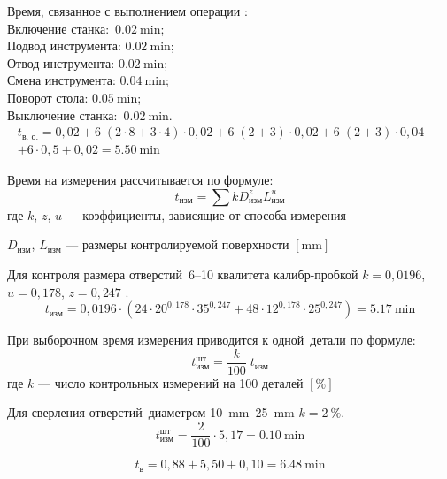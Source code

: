 \documentclass[14pt,russian,a4paper]{extreport}
\begin{document}
Время, связанное с выполнением операции \cite[прил.~4]{malzen:normirovanie}: \\
Включение станка: $\SI{0,02}{\minute}$; \\
Подвод инструмента: $\SI{0,02}{\minute}$; \\
Отвод инструмента: $\SI{0,02}{\minute}$; \\
Смена инструмента: $\SI{0,04}{\minute}$; \\
Поворот стола: $\SI{0,05}{\minute}$; \\
Выключение станка: $\SI{0,02}{\minute}$.
\begin{multline*}
  t_\text{в. о.} = 0,02 + 6 \; (2 \cdot 8 + 3 \cdot 4) \cdot 0,02  + 6 \; (2 + 3) \cdot 0,02 + 6 \; (2 + 3) \cdot 0,04 \; + \\ + 6 \cdot 0,5 + 0,02 = \SI{5,50}{\minute}
\end{multline*}

Время на измерения рассчитывается по формуле:
\begin{equation}
  t_\text{изм} = \sum k D_\text{изм}^z L_\text{изм}^u
\end{equation}
где $k$, $z$, $u$ --- коэффициенты, зависящие от способа измерения \par
$D_\text{изм}$, $L_\text{изм}$ --- размеры контролируемой поверхности $\left[\si{\milli\meter}\right]$

Для контроля размера отверстий \numrange{6}{10} квалитета калибр-пробкой $ k = 0,0196 $, $ u = 0,178 $, $ z = 0,247 $ \cite[прил.~5]{malzen:normirovanie}.
\begin{equation*}
  t_\text{изм} = 0,0196 \cdot (24 \cdot 20^{0,178} \cdot 35^{0,247} + 48 \cdot 12^{0,178} \cdot 25^{0,247}) = \SI{5,17}{\minute}
\end{equation*}

При выборочном время измерения приводится к одной детали по формуле:
\begin{equation}
  t_\text{изм}^\text{шт} = \frac{k}{100} \; t_\text{изм}
\end{equation}
где $k$ --- число контрольных измерений на 100 деталей $[\%]$

Для сверления отверстий диаметром \SIrange{10}{25}{\milli\meter} $ k = \SI{2}{\percent} $.
\begin{equation*}
  t_\text{изм}^\text{шт} = \frac{2}{100} \cdot 5,17 = \SI{0,10}{\minute}
\end{equation*}

\begin{equation*}
  t_\text{в} = 0,88 + 5,50 + 0,10 = \SI{6,48}{\minute}
\end{equation*}
\end{document}
